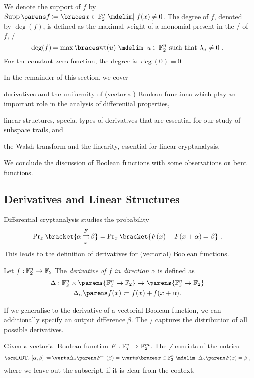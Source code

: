We denote the support of $f$ by $\supp{f} \coloneqq \set{x \in \F_2^n \given f(x) \neq 0}$.
The degree of $f$, denoted by $\deg(f)$, is defined as the maximal weight of a monomial present in the \ANF/ of $f$, \ie/
\begin{equation*}
    \deg(f) = \max \set{\wt(u) \given u \in \F_2^n \ \text{such that}\ \lambda_u \ne 0}\;.
\end{equation*}
For the constant zero function, the degree is $\deg(0) = 0$.

In the remainder of this section, we cover \begin{inparaenum}
\item derivatives and the uniformity of (vectorial) Boolean functions which play an important role in the analysis of differential properties,
\item linear structures, special types of derivatives that are essential for our study of subspace trails, and
\item the Walsh transform and the linearity, essential for linear cryptanalysis.
\end{inparaenum}
We conclude the discussion of Boolean functions with some observations on bent functions.

\subsection{Derivatives and Linear Structures}
Differential cryptanalysis studies the probability
\begin{equation}\label{eqn:prob-diff}
    \Prob_x\bracket{\propDiff{\alpha}{F}{x}{\beta}} = \Prob_x\bracket{F(x) + F(x+\alpha) = \beta}\;.
\end{equation}
This leads to the definition of derivatives for (vectorial) Boolean functions.
\begin{definition}[Derivative]
    Let $f : \mathbb{F}_2^n \to \mathbb{F}_2$
    The \emph{derivative of $f$ in direction $\alpha$} is defined as
    \begin{gather*}
        \Delta : \F_2^n \times \parens{\F_2^n \to \F_2} \to \parens{\F_2^n \to \F_2} \\
        \derive{\alpha}{f}(x) \coloneqq f(x) + f(x + \alpha).
    \end{gather*}
\end{definition}
If we generalise to the derivative of a vectorial Boolean function, we can additionally specify an output difference $\beta$.
The \DDTs/ captures the distribution of all possible derivatives.
\begin{definition}
    Given a vectorial Boolean function $F : \mathbb{F}_2^n \to \mathbb{F}_2^m$.
    The \emph{\DDT/} consists of the entries
    \begin{equation*}
        \text{\DDTs/}_F[\alpha, \beta] \coloneqq \abs{\derive{\alpha}{F}^{-1}(\beta)} = \abs{\set{x \in \F_2^n \given \derive{\alpha}{F}(x) = \beta}}\;,
    \end{equation*}
    where we leave out the subscript, if it is clear from the context.
\end{definition}

